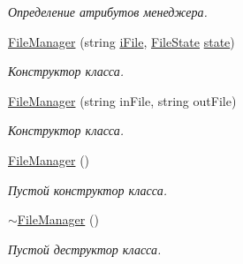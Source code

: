 \begin{DoxyCompactItemize}
\begin{DoxyCompactList}\small\item\em Определение атрибутов менеджера. \end{DoxyCompactList}\item 
\hyperlink{class_file_manager_a62d69473c95f8df25e44d2466bb00dc5}{File\+Manager} (string \hyperlink{class_file_manager_a91fd33cbb230ed4974a678302e906a8d}{i\+File}, \hyperlink{_structures_8h_a57306ae0f9e356347388234ed69e0ce7}{File\+State} \hyperlink{class_file_manager_a84bbcd4e3807e076ecdbd0e5dfbefa5f}{state})
\begin{DoxyCompactList}\small\item\em Конструктор класса. \end{DoxyCompactList}\item 
\hyperlink{class_file_manager_a2456e56bdcb617c3ee75521cf9dd7057}{File\+Manager} (string in\+File, string out\+File)
\begin{DoxyCompactList}\small\item\em Конструктор класса. \end{DoxyCompactList}\item 
\hyperlink{class_file_manager_a8afd512c06be9daf140cc19d71f9b391}{File\+Manager} ()
\begin{DoxyCompactList}\small\item\em Пустой конструктор класса. \end{DoxyCompactList}\item 
\hyperlink{class_file_manager_abaed33b5b0c13b8a597db9335a1aacfa}{$\sim$\+File\+Manager} ()
\begin{DoxyCompactList}\small\item\em Пустой деструктор класса. \end{DoxyCompactList}\end{DoxyCompactItemize}
